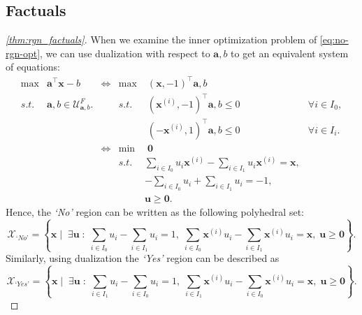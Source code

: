 \documentclass{article}
\begin{document}
{\subsection{Factuals}\label{app:proofs_factuals}
\begin{proof}[\cref{thm:rgn_factuals}]
    When we examine the inner optimization problem of \eqref{eq:no-rgn-opt}, we can use dualization with respect to $\bm{a},b$ to get an equivalent system of equations:
\[\begin{array}{rlcrllc}
     \max&\bm{a}^{\top}\bm{x} - b &\iff& \max &\;(\bm{x},-1)^{\top}\bm{a},b\\
    s.t. &\bm{a},b\in \mathcal{U}_{\bm{a},b}^F.&&s.t. &\;(\bm{x}^{(i)},-1)^{\top}\bm{a},b\leq 0 &\forall i\in I_{0},\\
    && &&\;(-\bm{x}^{(i)},1)^{\top}\bm{a},b\leq 0 &\forall i\in I_i.\\
    &&\iff& \min &\;\bm{0}\\
    &&&s.t. &\sum_{i\in I_{0}}u_i\bm{x}^{(i)} - \sum_{i\in I_1}u_i\bm{x}^{(i)}=\bm{x},\\
    &&&&-\sum_{i\in I_{0}}u_i + \sum_{i\in I_1}u_i=-1,\\
    &&&& \bm{u}\geq \bm{0}.
\end{array}
\]
Hence, the \textit{`No'} region can be written as the following polyhedral set:
\[ \mathcal{X}_{\textit{`No'}} = \left\{ \bm{x} \; | \;\; \exists \bm{u} \; : \;
\sum_{i\in I_{0}} u_i- \sum_{i\in I_1} u_i = 1, \; 
\sum_{i\in I_{0}} \bm{x}^{(i)}u_i- \sum_{i\in I_1} \bm{x}^{(i)}u_i = \bm{x}, \; 
 \bm{u}\geq \bm{0}\right\}. \]
Similarly, using dualization the \textit{`Yes'} region can be described as
\[ \mathcal{X}_{\textit{`Yes'}} =\left\{ \bm{x} \; | \;\; \exists \bm{u} \; : \;
\sum_{i\in I_1} u_i- \sum_{i\in I_{0}} u_i = 1, \; 
\sum_{i\in I_1} \bm{x}^{(i)}u_i- \sum_{i\in I_{0}} \bm{x}^{(i)}u_i = \bm{x}, \; 
 \bm{u}\geq \bm{0}\right\}. \]
\end{proof}


}
\end{document}
